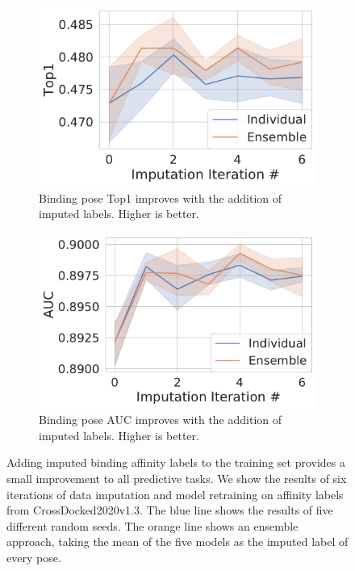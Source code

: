 \documentclass[journal=jmcmar,manuscript=article]{achemso}
\begin{document}
\begin{figure}[tbph]
    \begin{subfigure}[t]{0.48\textwidth}
        \centering
        \includegraphics[width=\linewidth]{figures/InitialImpTop1.pdf}
        \caption{Binding pose Top1 improves with the addition of imputed labels. Higher is better.}
    \end{subfigure}
    \hfill
    \begin{subfigure}[t]{0.48\textwidth}
        \centering
        \includegraphics[width=\linewidth]{figures/InitialImpAUC.pdf}
        \caption{Binding pose AUC improves with the addition of imputed labels. Higher is better.}
    \end{subfigure}
    \caption{Adding imputed binding affinity labels to the training set provides a small improvement to all predictive tasks. We show the results of six iterations of data imputation and model retraining on affinity labels from CrossDocked2020v1.3. The blue line shows the results of five different random seeds. The orange line shows an ensemble approach, taking the mean of the five models as the imputed label of every pose.}
    \label{fig:initialImp}
\end{figure}
\end{document}
